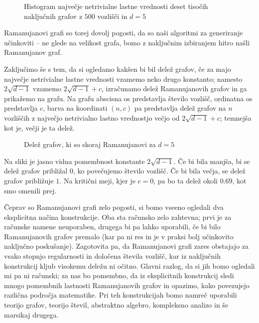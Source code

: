 \begin{figure}[H]
    \begin{center}
        
    \end{center}
    \caption{Histogram največje netrivialne lastne vrednosti deset tisočih naključnih grafov z \(500\) vozlišči in \(d=5\)}
\end{figure}

Ramanujanovi grafi so torej dovolj pogosti, da so naši algoritmi za generiranje učinkoviti -- ne glede na velikost grafa, bomo z naključnim izbiranjem hitro našli Ramanujanov graf.

Zaključimo še s tem, da si ogledamo kakšen bi bil delež grafov, če za majo največje netrivialne lastne vrednosti vzamemo neko drugo konstanto; namesto \(2\sqrt{d-1}\) vzamemo \(2\sqrt{d-1} + c\), izračunamo delež Ramanujanovih grafov in ga prikažemo na grafu. Na grafu abscisna os predstavlja število vozlišč, ordinatna os predstavlja \(c\), barva na koordinati \((n,c)\) pa predstavlja delež grafov na \(n\) vozliščih z največjo netrivialno lastno vrednostjo večjo od \(2\sqrt{d-1}+c\); temnejša kot je, večji je ta delež.
\begin{figure}[H]
    \begin{center}
        
    \end{center}
    \caption{Delež grafov, ki so skoraj Ramanujanovi za \(d=5\)}
\end{figure}
Na sliki je jasno vidna pomembnost konstante \(2\sqrt{d-1}\). Če bi bila manjša, bi se delež grafov približal \(0\), ko povečujemo število vozlišč. Če bi bila večja, se delež grafov približuje \(1\). Na kritični meji, kjer je \(c=0\), pa bo ta delež okoli \(0.69\), kot smo omenili prej.

Čeprav so Ramanujanovi grafi zelo pogosti, si bomo vseeno ogledali dva eksplicitna načina konstrukcije. Oba sta računsko zelo zahtevna; prvi je za računske namene neuporaben, drugega bi pa lahko uporabili, če bi bilo Ramanujanovih grafov premalo (kar pa ni res in je v praksi bolj učinkovito naključno poskušanje). Zagotovita pa, da Ramanujanovi grafi zares obstajajo za vsako stopnjo regularnosti in določena števila vozlišč, kar iz naključnih konstrukcij kljub visokemu deležu ni očitno. Glavni razlog, da si jih bomo ogledali mi pa ni računski; za nas bo pomembno, da iz eksplicitnih konstrukcij sledi mnogo pomembnih lastnosti Ramanujanovih grafov in opazimo, kako povezujejo različna področja matematike. Pri teh konstrukcijah bomo namreč uporabili teorijo grafov, teorijo števil, abstraktno algebro, kompleksno analizo in še marsikaj drugega.

